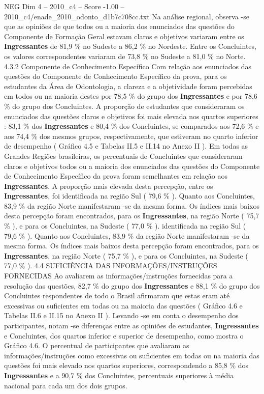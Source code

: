 \begin{textsample}{NEG Dim 4 – 2010\_c4 – Score -1.00 – 2010\_c4/enade\_2010\_odonto\_d1b7c708cc.txt}
Na análise regional, observa -se que as opiniões de que todos ou a maioria dos enunciados das questões do Componente de Formação Geral estavam claros e objetivos variaram entre os \textbf{Ingressantes} de 81,9 \% no Sudeste a 86,2 \% no Nordeste.
Entre os Concluintes, os valores correspondentes variaram de 73,8 \% no Sudeste a 81,0 \% no Norte. 4.3.2 Componente de Conhecimento Específico Com relação aos enunciados das questões do Componente de Conhecimento Específico da prova, para os estudantes da Área de Odontologia, a clareza e a objetividade foram percebidas em todos ou na maioria destes por 78,5 \% do grupo dos \textbf{Ingressantes} e por 78,6 \% do grupo dos Concluintes.
A proporção de estudantes que consideraram os enunciados das questões claros e objetivos foi mais elevada nos quartos superiores : 83,1 \% dos \textbf{Ingressantes} e 80,4 \% dos Concluintes, se comparados aos 72,6 \% e aos 74,4 \% dos mesmos grupos, respectivamente, que estiveram no quarto inferior de desempenho ( Gráfico 4.5 e Tabelas II.5 e II.14 no Anexo II ).
Em todas as Grandes Regiões brasileiras, os percentuais de Concluintes que consideraram claros e objetivos todos ou a maioria dos enunciados das questões do Componente de Conhecimento Específico da prova foram semelhantes em relação aos \textbf{Ingressantes}.
A proporção mais elevada desta percepção, entre os \textbf{Ingressantes}, foi identificada na região Sul ( 79,6 \% ).
Quanto aos Concluintes, 83,9 \% da região Norte manifestaram -se da mesma forma.
Os índices mais baixos desta percepção foram encontrados, para os \textbf{Ingressantes}, na região Norte ( 75,7 \% ), e para os Concluintes, na Sudeste ( 77,0 \% ). identificada na região Sul ( 79,6 \% ).
Quanto aos Concluintes, 83,9 \% da região Norte manifestaram -se da mesma forma.
Os índices mais baixos desta percepção foram encontrados, para os \textbf{Ingressantes}, na região Norte ( 75,7 \% ), e para os Concluintes, na Sudeste ( 77,0 \% ). 4.4 SUFICIÊNCIA DAS INFORMAÇÕES/INSTRUÇÕES FORNECIDAS Ao avaliarem as informações/instruções fornecidas para a resolução das questões, 82,7 \% do grupo dos \textbf{Ingressantes} e 88,1 \% do grupo dos Concluintes respondentes de todo o Brasil afirmaram que estas eram até excessivas ou suficientes em todas ou na maioria das questões ( Gráfico 4.6 e Tabelas II.6 e II.15 no Anexo II ).
Levando -se em conta o desempenho dos participantes, notam -se diferenças entre as opiniões de estudantes, \textbf{Ingressantes} e Concluintes, dos quartos inferior e superior de desempenho, como mostra o Gráfico 4.6.
O percentual de participantes que avaliaram as informações/instruções como excessivas ou suficientes em todas ou na maioria das questões foi mais elevado nos quartos superiores, correspondendo a 85,8 \% dos \textbf{Ingressantes} e a 90,7 \% dos Concluintes, percentuais superiores à média nacional para cada um dos dois grupos.

\end{textsample}
